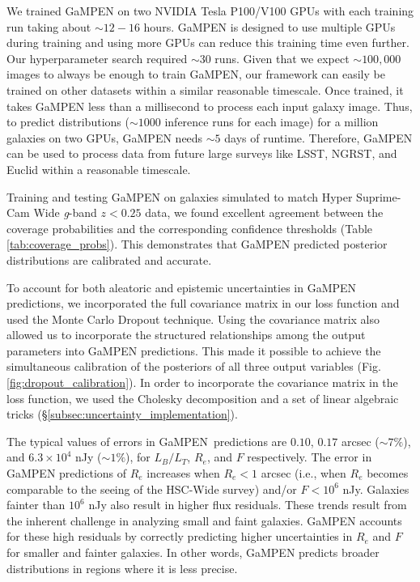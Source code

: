 \documentclass[twocolumn]{aastex63}
\newcommand\gampen{GaMPEN}
\begin{document}
\begin{CJK*}{UTF8}{gbsn}
We trained \gampen{} on two  NVIDIA Tesla P100/V100 GPUs with each training run taking about $\sim 12 - 16$ hours. \gampen{} is designed to use multiple GPUs during training and using more GPUs can reduce this training time even further. Our hyperparameter search required $\sim 30$ runs. Given that we expect $\sim 100,000$ images to always be enough to train \gampen{}, our framework can easily be trained on other datasets within a similar reasonable timescale. Once trained, it takes \gampen{} less than a millisecond to process each input galaxy image. Thus, to predict distributions ($\sim 1000$ inference runs for each image) for a million galaxies on two GPUs, \gampen{} needs $\sim 5$ days of runtime. Therefore, \gampen{} can be used to process data from future large surveys like LSST, NGRST, and Euclid within a reasonable timescale.

Training and testing \gampen{} on galaxies simulated to match Hyper Suprime-Cam Wide \textit{g}-band $z<0.25$ data, we found excellent agreement between the coverage probabilities and the corresponding confidence thresholds (Table \ref{tab:coverage_probs}). 
This demonstrates that \gampen{} predicted posterior distributions are calibrated and accurate.

To account for both aleatoric and epistemic uncertainties in \gampen{} predictions, we incorporated the full covariance matrix in our loss function and used the Monte Carlo Dropout technique. Using the covariance matrix also allowed us to incorporate the structured relationships among the output parameters into \gampen{} predictions. This made it possible to achieve the simultaneous calibration of the posteriors of all three output variables (Fig. \ref{fig:dropout_calibration}). In order to incorporate the covariance matrix in the loss function, we used the Cholesky decomposition and a set of linear algebraic tricks (\S \ref{subsec:uncertainty_implementation}).

The typical values of errors in \gampen\ predictions are $0.10$, $0.17$ arcsec {($\sim 7\%$)}, and $6.3\times10^4$ nJy ($\sim 1\%$), for $L_B/L_T$, $R_e$, and $F$ respectively. The error in \gampen{} predictions of $R_e$ increases when $R_e < 1$ arcsec (i.e., when $R_e$ becomes comparable to the seeing of the HSC-Wide survey) and/or $F < 10^6$ nJy. Galaxies fainter than $10^6$ nJy also result in higher flux residuals. These trends result from the inherent challenge in analyzing small and faint galaxies. \gampen{} accounts for these high residuals by correctly predicting higher uncertainties in $R_e$ and $F$ for smaller and fainter galaxies. In other words, \gampen{} predicts broader distributions in regions where it is less precise.


\end{CJK*}
\end{document}
